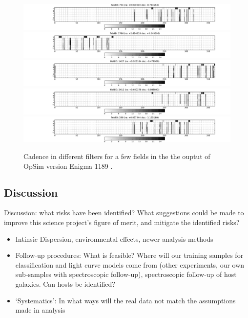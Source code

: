 \begin{figure}
\includegraphics[width=\textwidth]{figs/supernova/fig_firstSeason_0}
\includegraphics[width=\textwidth]{figs/supernova/fig_firstSeason_1}
\includegraphics[width=\textwidth]{figs/supernova/fig_firstSeason_2}
\includegraphics[width=\textwidth]{figs/supernova/fig_firstSeason_3}
\includegraphics[width=\textwidth]{figs/supernova/fig_firstSeason_4}
\label{fig:opsimSummary}
\caption{Cadence in different filters for a few fields in the the ouptut
    of OpSim version Enigma 1189 .}
\end{figure}




\subsection{Discussion}
\label{sec:keyword:discussion}

Discussion: what risks have been identified? What suggestions could be
made to improve this science project's figure of merit, and mitigate
the identified risks?


\begin{itemize}
\item Intinsic Dispersion, environmental effects, newer analysis methods
\item Follow-up procedures: What is feasible? Where will our training samples for classification and light curve models come from (other experiments, our own 
sub-samples with spectroscopic follow-up), spectroscopic follow-up of host galaxies. Can hosts be identified?
\item `Systematics': In what ways will the real data not match the assumptions made in analysis
\end{itemize}



\navigationbar
